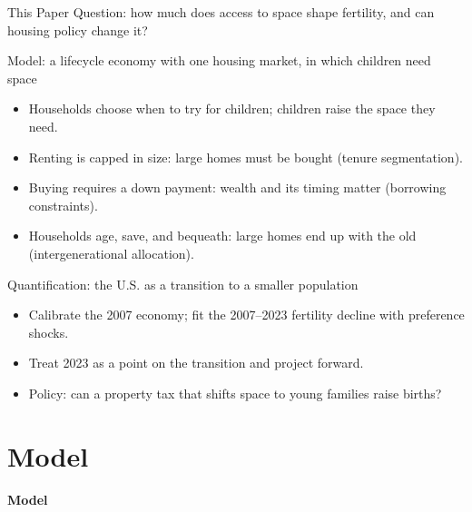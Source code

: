 \begin{frame}{This Paper}
\small
\alert{Question:} how much does access to space shape fertility, and can housing policy change it?

\medskip
\alert{Model:} a lifecycle economy with one housing market, in which children need space
\begin{itemize}\setlength\itemsep{2pt}
  \item Households choose when to try for children; children raise the space they need.
  \item Renting is capped in size: large homes must be bought (tenure segmentation).
  \item Buying requires a down payment: wealth and its timing matter (borrowing constraints).
  \item Households age, save, and bequeath: large homes end up with the old (intergenerational allocation).
\end{itemize}

\medskip
\alert{Quantification:} the U.S. as a transition to a smaller population
\begin{itemize}\setlength\itemsep{2pt}
  \item Calibrate the 2007 economy; fit the 2007--2023 fertility decline with preference shocks.
  \item Treat 2023 as a point on the transition and project forward.
  \item Policy: can a property tax that shifts space to young families raise births?
\end{itemize}
\end{frame}

\section{Model}

\begin{frame}{}
\centering
{\Large\textbf{Model}}
\end{frame}

